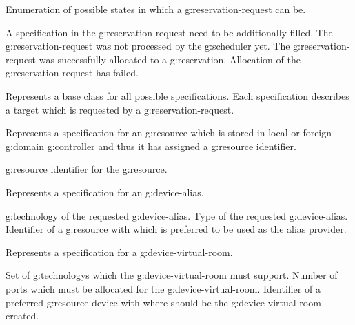 \begin{Api}
Enumeration of possible states in which a \gls{g:reservation-request} can be.
\begin{ApiEnumValues}
 A specification in the \gls{g:reservation-request} need to be additionally filled.
 The \gls{g:reservation-request} was not processed by the \gls{g:scheduler} yet.
 The \gls{g:reservation-request} was successfully allocated to a \gls{g:reservation}.
 Allocation of the \gls{g:reservation-request} has failed.
\end{ApiEnumValues}

Represents a base class for all possible specifications. Each specification describes a target which is requested by a \gls{g:reservation-request}.

Represents a specification for an \gls{g:resource} which is stored in local or foreign \gls{g:domain} \gls{g:controller} and thus it has assigned a \gls{g:resource} identifier.
\begin{ApiClassAttributes}
 \Gls{g:resource} identifier for the \gls{g:resource}.
\end{ApiClassAttributes}

Represents a specification for an \gls{g:device-alias}.
\begin{ApiClassAttributes}
 \Gls{g:technology} of the requested \gls{g:device-alias}.
 Type of the requested \gls{g:device-alias}.
 Identifier of a \gls{g:resource} with  which is preferred to be used as the alias provider.
\end{ApiClassAttributes}

Represents a specification for a \gls{g:device-virtual-room}.
\begin{ApiClassAttributes}
 Set of \glspl{g:technology} which the \gls{g:device-virtual-room} must support.
 Number of ports which must be allocated for the \gls{g:device-virtual-room}.
 Identifier of a preferred \gls{g:resource-device} with  where should be the \gls{g:device-virtual-room} created.
\end{ApiClassAttributes}


\end{Api}

